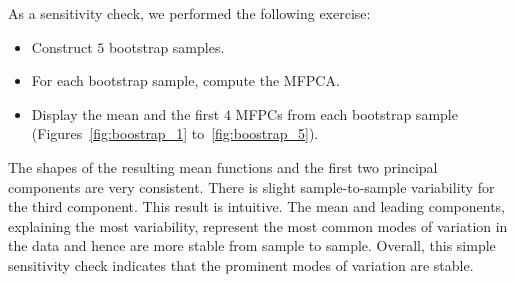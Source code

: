 \documentclass[USenglish]{article}
\theoremstyle{dgthm}
\theoremstyle{dgdef}
\begin{document}
\begin{appendix}
As a sensitivity check, we performed the following exercise:
	\begin{itemize}
		\item Construct $5$ bootstrap samples.
		\item For each bootstrap sample, compute the MFPCA.
		\item Display the mean and the first $4$ MFPCs from each bootstrap sample (Figures~\ref{fig:boostrap_1} to~\ref{fig:boostrap_5}).
	\end{itemize}
	The shapes of the resulting mean functions and the first two principal components are very consistent.
	There is slight sample-to-sample variability for the third component.
	This result is intuitive. The mean and leading components, explaining the most variability, represent the most common modes of variation in the data and hence are more stable from sample to sample. Overall, this simple sensitivity check indicates that the prominent modes of variation are stable.


\end{appendix}
\end{document}
